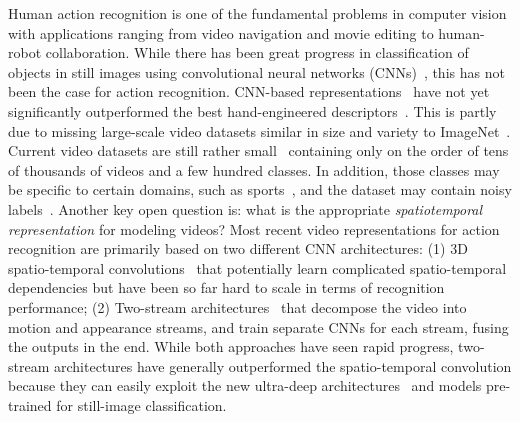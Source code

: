 \documentclass[10pt,twocolumn,letterpaper]{article}
\begin{document}
Human action recognition is one of the fundamental problems in computer vision with applications ranging from video navigation and movie editing to human-robot collaboration.  While there has been great progress in classification of objects in still images using convolutional neural networks
(CNNs)~\cite{He_16,He_16b,Simonyan_14a,Szegedy_16},
this has not been the case for action
recognition.
CNN-based
representations~\cite{Feichtenhofer_16,Varol_16,WangL_16a,WangX_16a,Zhu_15}
have not yet significantly outperformed the best hand-engineered
descriptors~\cite{deSouza_16,IDT_Wang_13}.
This is partly due to missing large-scale video datasets similar in size and variety to ImageNet~\cite{ImageNet}. 
Current video datasets are still rather small~\cite{hmdb51,charades,ucf101} containing only on the order of tens of thousands of videos and a few hundred classes. 
In addition, those classes may be specific to certain domains, such as sports~\cite{ucf101}, 
and the dataset may contain noisy
labels~\cite{Karpathy_14}.
Another key open question is: what is the appropriate {\em spatiotemporal representation} for modeling videos?       
Most recent video representations for action recognition are primarily based on two different CNN architectures: (1) 3D spatio-temporal convolutions~\cite{Tran_15,Varol_16} that potentially learn complicated spatio-temporal dependencies but have been so far hard to scale in terms of recognition performance;  (2) Two-stream architectures~\cite{Simonyan_14b} that  decompose the video into motion and appearance streams, and  train  separate  CNNs  for  each stream,  fusing  the  outputs  in the end.
While both approaches have seen rapid progress,
two-stream architectures have generally outperformed 
the spatio-temporal convolution because
they can easily exploit the new
ultra-deep architectures~\cite{He_16,Szegedy_16}
and models pre-trained for still-image classification.
\end{document}
